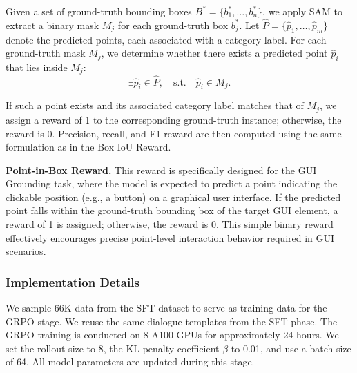 \noindent Given a set of ground-truth bounding boxes $B^* = \{b^*_1, \dots, b^*_n\}$, we apply SAM to extract a binary mask $M_j$ for each ground-truth box $b^*_j$. Let $\hat{P} = \{\hat{p}_1, \dots, \hat{p}_m\}$ denote the predicted points, each associated with a category label. For each ground-truth mask $M_j$, we determine whether there exists a predicted point $\hat{p}_i$ that lies inside $M_j$:
\begin{equation}
\exists \hat{p}_i \in \hat{P},\quad \text{s.t.} \quad \hat{p}_i \in M_j.
\end{equation}

\noindent If such a point exists and its associated category label matches that of $M_j$, we assign a reward of 1 to the corresponding ground-truth instance; otherwise, the reward is 0. Precision, recall, and F1 reward are then computed using the same formulation as in the Box IoU Reward.

\textbf{Point-in-Box Reward.} This reward is specifically designed for the GUI Grounding task, where the model is expected to predict a point indicating the clickable position (e.g., a button) on a graphical user interface. If the predicted point falls within the ground-truth bounding box of the target GUI element, a reward of 1 is assigned; otherwise, the reward is 0. This simple binary reward effectively encourages precise point-level interaction behavior required in GUI scenarios.

\subsubsection{Implementation Details}

We sample 66K data from the SFT dataset to serve as training data for the GRPO stage. We reuse the same dialogue templates from the SFT phase. The GRPO training is conducted on 8 A100 GPUs for approximately 24 hours. We set the rollout size to 8, the KL penalty coefficient $\beta$ to 0.01, and use a batch size of 64. All model parameters are updated during this stage.
